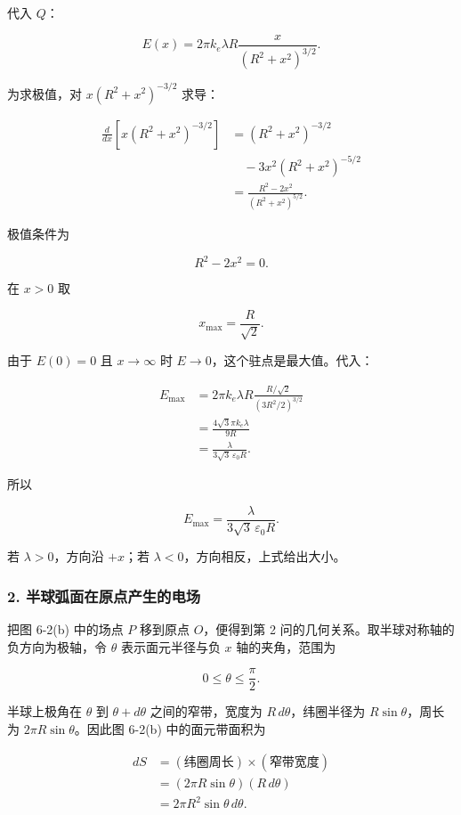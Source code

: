 \documentclass[12pt,a4paper,UTF8]{ctexart}
\begin{document}
代入 \(Q\)：

\[
E(x)=2\pi k_e\lambda R
\frac{x}{(R^2+x^2)^{3/2}}.
\]

为求极值，对 \(x(R^2+x^2)^{-3/2}\) 求导：

\[
\begin{aligned}
\frac{d}{dx}\left[x(R^2+x^2)^{-3/2}\right]
&=(R^2+x^2)^{-3/2}\\
&\quad-3x^2(R^2+x^2)^{-5/2}\\
&=\frac{R^2-2x^2}{(R^2+x^2)^{5/2}}.
\end{aligned}
\]

极值条件为

\[
R^2-2x^2=0.
\]

在 \(x>0\) 取

\[
\boxed{x_{\max}=\frac{R}{\sqrt2}}.
\]

由于 \(E(0)=0\) 且 \(x\to\infty\) 时 \(E\to0\)，这个驻点是最大值。代入：

\[
\begin{aligned}
E_{\max}
&=2\pi k_e\lambda R
\frac{R/\sqrt2}{(3R^2/2)^{3/2}}\\
&=\frac{4\sqrt3\pi k_e\lambda}{9R}\\
&=\frac{\lambda}{3\sqrt3\,\varepsilon_0R}.
\end{aligned}
\]

所以

\[
\boxed{E_{\max}=\frac{\lambda}{3\sqrt3\,\varepsilon_0R}}.
\]

若 \(\lambda>0\)，方向沿 \(+x\)；若
\(\lambda<0\)，方向相反，上式给出大小。

\subsubsection{2.
半球弧面在原点产生的电场}\label{ux534aux7403ux5f27ux9762ux5728ux539fux70b9ux4ea7ux751fux7684ux7535ux573a}

把图 6-2(b) 中的场点 \(P\) 移到原点 \(O\)，便得到第 2
问的几何关系。取半球对称轴的负方向为极轴，令 \(\theta\) 表示面元半径与负
\(x\) 轴的夹角，范围为

\[
0\le\theta\le\frac{\pi}{2}.
\]

半球上极角在 \(\theta\) 到 \(\theta+d\theta\) 之间的窄带，宽度为
\(R\,d\theta\)，纬圈半径为 \(R\sin\theta\)，周长为
\(2\pi R\sin\theta\)。因此图 6-2(b) 中的面元带面积为

\[
\begin{aligned}
dS
&=(\text{纬圈周长})\times(\text{窄带宽度})\\
&=(2\pi R\sin\theta)(R\,d\theta)\\
&=2\pi R^2\sin\theta\,d\theta.
\end{aligned}
\]
\end{document}
